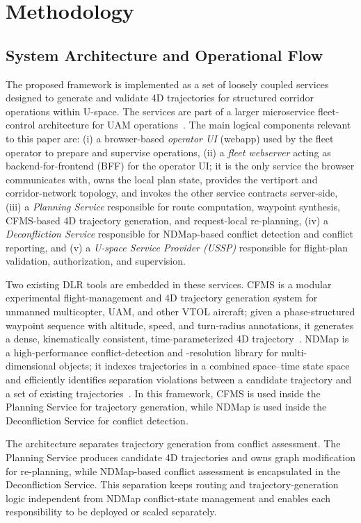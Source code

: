 \section{Methodology}
\label{sec:methodology}

\subsection{System Architecture and Operational Flow}
\label{sec:architecture}

The proposed framework is implemented as a set of loosely coupled services designed to generate and validate 4D trajectories for structured corridor operations within U-space. The services are part of a larger microservice fleet-control architecture for UAM operations~\cite{nagel2026microservice}. The main logical components relevant to this paper are:
(i) a browser-based \emph{operator UI} (webapp) used by the fleet operator to prepare and supervise operations,
(ii) a \emph{fleet webserver} acting as backend-for-frontend (BFF) for the operator UI; it is the only service the browser communicates with, owns the local plan state, provides the vertiport and corridor-network topology, and invokes the other service contracts server-side,
(iii) a \emph{Planning Service} responsible for route computation, waypoint synthesis, CFMS-based 4D trajectory generation, and request-local re-planning,
(iv) a \emph{Deconfliction Service} responsible for NDMap-based conflict detection and conflict reporting, and
(v) a \emph{U-space Service Provider (USSP)} responsible for flight-plan validation, authorization, and supervision.

Two existing DLR tools are embedded in these services. CFMS is a modular experimental flight-management and 4D trajectory generation system for unmanned multicopter, UAM, and other VTOL aircraft; given a phase-structured waypoint sequence with altitude, speed, and turn-radius annotations, it generates a dense, kinematically consistent, time-parameterized 4D trajectory~\cite{morscheck2021cfms}. NDMap is a high-performance conflict-detection and -resolution library for multi-dimensional objects; it indexes trajectories in a combined space--time state space and efficiently identifies separation violations between a candidate trajectory and a set of existing trajectories~\cite{NDMap}. In this framework, CFMS is used inside the Planning Service for trajectory generation, while NDMap is used inside the Deconfliction Service for conflict detection.

The architecture separates trajectory generation from conflict assessment. The Planning Service produces candidate 4D trajectories and owns graph modification for re-planning, while NDMap-based conflict assessment is encapsulated in the Deconfliction Service. This separation keeps routing and trajectory-generation logic independent from NDMap conflict-state management and enables each responsibility to be deployed or scaled separately.

